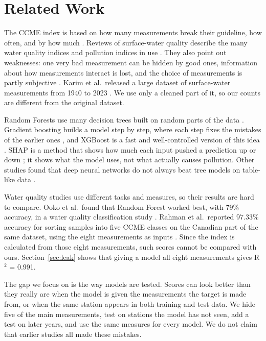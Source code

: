 \documentclass[11pt,a4paper]{article}
\begin{document}
\section{Related Work}
The CCME index is based on how many measurements break their guideline, how often, and by how much \cite{ccme2001}. Reviews of surface-water quality describe the many water quality indices and pollution indices in use \cite{syeed2023}. They also point out weaknesses: one very bad measurement can be hidden by good ones, information about how measurements interact is lost, and the choice of measurements is partly subjective \cite{chidiac2023}. Karim et al.\ released a large dataset of surface-water measurements from 1940 to 2023 \cite{karim2025}. We use only a cleaned part of it, so our counts are different from the original dataset.

Random Forests use many decision trees built on random parts of the data \cite{breiman2001}. Gradient boosting builds a model step by step, where each step fixes the mistakes of the earlier ones \cite{friedman2001}, and XGBoost is a fast and well-controlled version of this idea \cite{chen2016}. SHAP is a method that shows how much each input pushed a prediction up or down \cite{lundberg2017}; it shows what the model uses, not what actually causes pollution. Other studies found that deep neural networks do not always beat tree models on table-like data \cite{grinsztajn2022,shwartz2022}.

Water quality studies use different tasks and measures, so their results are hard to compare. Ooko et al.\ found that Random Forest worked best, with 79\% accuracy, in a water quality classification study \cite{ooko2023}. Rahman et al.\ reported 97.33\% accuracy for sorting samples into five CCME classes on the Canadian part of the same dataset, using the eight measurements as inputs \cite{rahman2026}. Since the index is calculated from those eight measurements, such scores cannot be compared with ours. Section~\ref{sec:leak} shows that giving a model all eight measurements gives R$^2$ = 0.991.

The gap we focus on is the way models are tested. Scores can look better than they really are when the model is given the measurements the target is made from, or when the same station appears in both training and test data. We hide five of the main measurements, test on stations the model has not seen, add a test on later years, and use the same measures for every model. We do not claim that earlier studies all made these mistakes.
\end{document}
